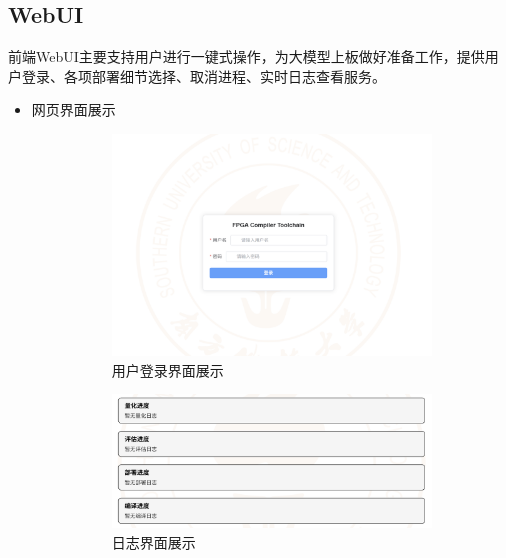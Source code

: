 \documentclass[AutoFakeBold,AutoFakeSlant,language=chinese,degree=bachelor]{sustechthesis}
\begin{document}
\subsection{WebUI}
前端WebUI主要支持用户进行一键式操作，为大模型上板做好准备工作，提供用户登录、各项部署细节选择、取消进程、实时日志查看服务。
\begin{itemize}
    \item 网页界面展示
        \begin{figure}[htb]
            \centering
            \begin{subfigure}[t]{.3\textwidth}
                \centering
                \includegraphics[width=\textwidth]{./figures/login_display.png}
                \caption{用户登录界面展示}
            \end{subfigure}
            \hfill
            \begin{subfigure}[t]{.48\textwidth}
                \centering
                \includegraphics[width=\textwidth]{./figures/log_display.png}
                \caption{日志界面展示}
            \end{subfigure}
            \hfill
            \begin{subfigure}[t]{.2\textwidth}

\end{subfigure}
\end{figure}
\end{itemize}
\end{document}

